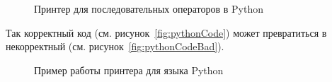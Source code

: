 \begin{figure}[h!]
	
	\caption{Принтер для последовательных операторов в Python}
	\label{fig:pythonPrinter}
\end{figure}

Так корректный код (см. рисунок~\ref{fig:pythonCode}) может превратиться в некорректный (см. рисунок~\ref{fig:pythonCodeBad}).
\begin{figure}[h!]
	\centering
	\null\hfill
	\subfloat[]{
		\centering
		
		\label{fig:pythonCode}	
	}
	\null\hfill
	\subfloat[]{
		\centering
		
		\label{fig:pythonCodeBad}
	}
	\hfill
	\null
	\caption{Пример работы принтера для языка Python}
\end{figure}
